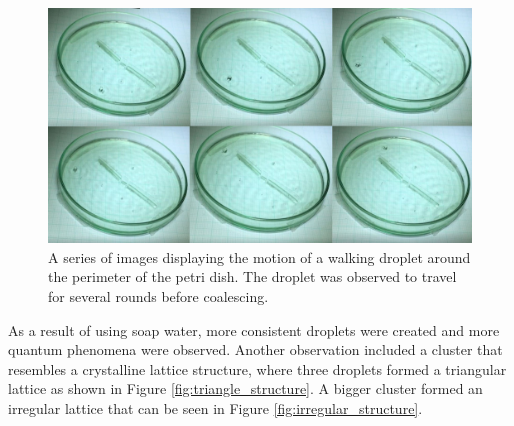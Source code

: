 \begin{figure}[htb]
\includegraphics[width=\textwidth]{prototype/exp_rep_imgs/double_slit_walking_perimeter.jpg}
\centering
\caption{A series of images displaying the motion of a walking droplet around the perimeter of the petri dish. The droplet was observed to travel for several rounds before coalescing.}
\centering
\label{fig:double_slit_walking_perimeter}
\end{figure}

As a  result of using soap water, more consistent droplets were created and more quantum phenomena were observed. Another observation included a cluster that resembles a crystalline lattice structure, where three droplets formed a triangular lattice as shown in Figure \ref{fig:triangle_structure}. A bigger cluster formed an irregular lattice that can be seen in Figure \ref{fig:irregular_structure}.

